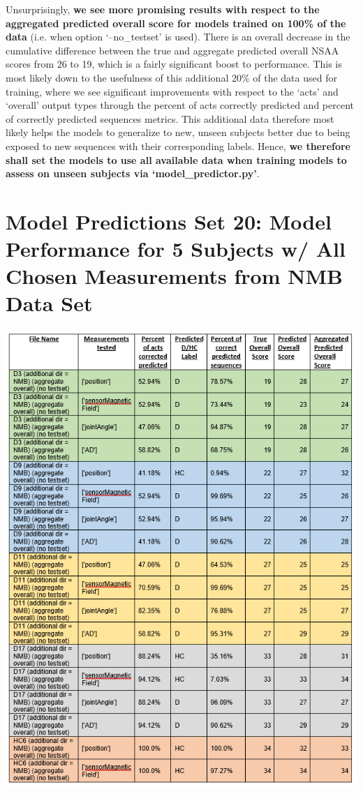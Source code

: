 \documentclass[12pt,twoside]{report}
\begin{document}
\quad Unsurprisingly, \textbf{we see more promising results with respect to the aggregated predicted overall score for models trained on 100\% of the data} (i.e. when option ‘--no\_testset’ is used). There is an overall decrease in the cumulative difference between the true and aggregate predicted overall NSAA scores from 26 to 19, which is a fairly significant boost to performance. This is most likely down to the usefulness of this additional 20\% of the data used for training, where we see significant improvements with respect to the ‘acts’ and ‘overall’ output types through the percent of acts correctly predicted and percent of correctly predicted sequences metrics. This additional data therefore most likely helps the models to generalize to new, unseen subjects better due to being exposed to new sequences with their corresponding labels. Hence, \textbf{we therefore shall set the models to use all available data when training models to assess on unseen subjects via ‘model\_predictor.py’}.\\




\section{Model Predictions Set 20: Model Performance for 5 Subjects w/ All Chosen Measurements from NMB Data Set}

\begin{center}
\includegraphics[scale=0.8]{project_figures/fig11_27}
\end{center}
\end{document}
